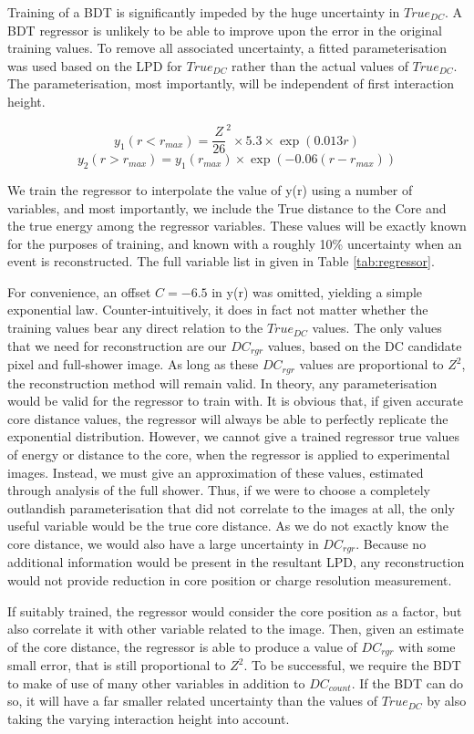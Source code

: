 \documentclass[11pt]{article}
\begin{document}
Training of a BDT is significantly impeded by the huge uncertainty in $True_{DC}$. A BDT regressor is unlikely to be able to improve upon the error in the original training values. To remove all associated uncertainty, a fitted parameterisation was used based on the LPD for $True_{DC}$ rather than the actual values of $True_{DC}$. The parameterisation, most importantly, will be independent of first interaction height. 

\[ y_{1}(r<r_{max}) = \frac{Z}{26}^{2} \times 5.3 \times \exp(0.013 r)\]
\[ y_{2}(r > r_{max}) = y_{1}(r_{max}) \times \exp (-0.06( r-r_{max})) \]

We train the regressor to interpolate the value of y(r) using a number of variables, and most importantly, we include the True distance to the Core and the true energy among the regressor variables. These values will be exactly known for the purposes of training, and known with a roughly 10\% uncertainty when an event is reconstructed. The full variable list in given in Table \ref{tab:regressor}. 

For convenience, an offset $C=-6.5$ in y(r) was omitted, yielding a simple exponential law. Counter-intuitively, it does in fact not matter whether the training values bear any direct relation to the $True_{DC}$ values. The only values that we need for reconstruction are our $DC_{rgr}$ values, based on the DC candidate pixel and full-shower image. As long as these $DC_{rgr}$ values are proportional to $Z^{2}$, the reconstruction method will remain valid. In theory, any parameterisation would be valid for the regressor to train with. It is obvious that, if given accurate core distance values, the regressor will always be able to perfectly replicate the exponential distribution. However, we cannot give a trained regressor true values of energy or distance to the core, when the regressor is applied to experimental images. Instead, we must give an approximation of these values, estimated through analysis of the full shower. Thus, if we were to choose a completely outlandish parameterisation that did not correlate to the images at all, the only useful variable would be the true core distance. As we do not exactly know the core distance, we would also have a large uncertainty in $DC_{rgr}$. Because no additional information would be present in the resultant LPD, any reconstruction would not provide reduction in core position or charge resolution measurement. 

If suitably trained, the regressor would consider the core position as a factor, but also correlate it with other variable related to the image. Then, given an estimate of the core distance, the regressor is able to produce a value of $DC_{rgr}$ with some small error, that is still proportional to $Z^{2}$. To be successful, we require the BDT to make of use of many other variables in addition to $DC_{count}$. If the BDT can do so, it will have a far smaller related uncertainty than the values of $True_{DC}$ by also taking the varying interaction height into account.
\end{document}
